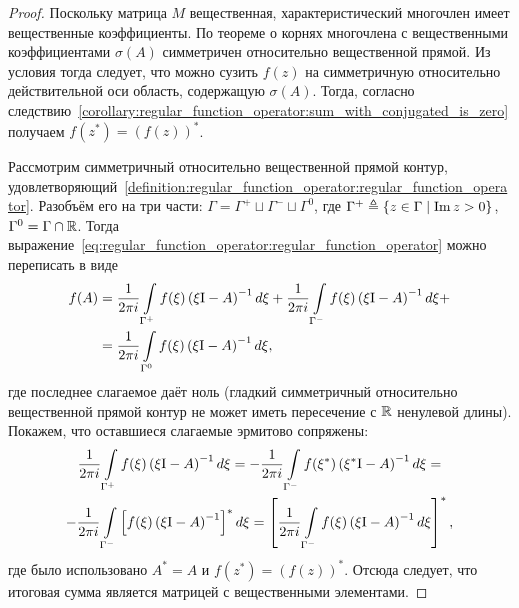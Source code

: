 \begin{proof}
    Поскольку матрица $ M $ вещественная,
    характеристический многочлен имеет вещественные коэффициенты.
    По теореме о корнях многочлена с вещественными коэффициентами
    $ \sigma(A) $ симметричен относительно вещественной прямой.
    Из условия тогда следует, что можно сузить $ f(z) $
    на симметричную относительно действительной оси область,
    содержащую $ \sigma(A) $.
    Тогда, согласно следствию~\ref{corollary:regular_function_operator:sum_with_conjugated_is_zero}
    получаем $ f(z^*) = (f(z))^* $.

    Рассмотрим симметричный относительно вещественной прямой контур,
    удовлетворяющий~\ref{definition:regular_function_operator:regular_function_operator}.
    Разобъём его на три части: $ \Gamma = \Gamma^+ \sqcup \Gamma^- \sqcup \Gamma^0 $,
    где $ \Gamma^+ \triangleq \{ z \in \Gamma \mid \operatorname{Im} z > 0 \} $, $ \Gamma^0 = \Gamma \cap \mathbb{R} $.
    Тогда выражение~\eqref{eq:regular_function_operator:regular_function_operator} можно переписать в виде
    \begin{align*}
        f(A) &= \frac{1}{2 \pi i} \int\limits_{\Gamma^+} f(\xi) \left( \xi \mathrm{I} - A \right)^{-1} d \xi +
                \frac{1}{2 \pi i} \int\limits_{\Gamma^-} f(\xi) \left( \xi \mathrm{I} - A \right)^{-1} d \xi + \\
             &= \frac{1}{2 \pi i} \int\limits_{\Gamma^0} f(\xi) \left( \xi \mathrm{I} - A \right)^{-1} d \xi,
    \end{align*}
    где последнее слагаемое даёт ноль
    (гладкий симметричный относительно вещественной прямой контур не может иметь пересечение с $ \mathbb{R} $ ненулевой длины).
    Покажем, что оставшиеся слагаемые эрмитово сопряжены:
    \begin{multline*}
        \frac{1}{2 \pi i} \int\limits_{\Gamma^+} f(\xi) \left( \xi \mathrm{I} - A \right)^{-1} d \xi =
        -\frac{1}{2 \pi i} \int\limits_{\Gamma^-} f(\xi^*) \left( \xi^* \mathrm{I} - A \right)^{-1} d \xi = \\
        -\frac{1}{2 \pi i} \int\limits_{\Gamma^-} \left[ f(\xi) \left( \xi \mathrm{I} - A \right)^{-1} \right]^* d \xi =
        \left[ \frac{1}{2 \pi i} \int\limits_{\Gamma^-} f(\xi) \left( \xi \mathrm{I} - A \right)^{-1} d \xi \right]^*,
    \end{multline*}
    где было использовано $ A^* = A $ и $ f(z^*) = (f(z))^* $.
    Отсюда следует, что итоговая сумма является матрицей с вещественными элементами.
\end{proof}



